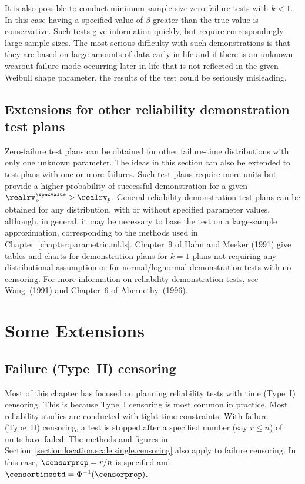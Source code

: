It is also possible to conduct minimum sample size zero-failure
tests with $k < 1$. In this case having a specified value of $\beta$
greater than the true value is conservative.  Such tests give
information quickly, but require correspondingly large sample
sizes. The most serious difficulty with such demonstrations is that
they are based on large amounts of data early in life and if there
is an unknown wearout failure mode occurring later in life that is
not reflected in the given Weibull shape parameter, the results of
the test could be seriously misleading.

\subsection{Extensions for other reliability demonstration test plans}

Zero-failure test plans can be obtained for other failure-time
distributions with only one unknown parameter. The ideas in this
section can also be extended to test plans with one or more failures.  Such
test plans require more units but provide a higher probability of
successful demonstration for a given $\realrv_{p}^{\specvalue} >
\realrv_{p}$.  General reliability demonstration test plans can be
obtained for any distribution, with or without specified parameter
values, although, in general, it may be necessary to base the test
on a large-sample approximation, corresponding to the methods used
in Chapter~\ref{chapter:parametric.ml.ls}.  Chapter~9 of Hahn and
Meeker (1991) give tables and charts for demonstration plans for
$k=1$ plans not requiring any distributional assumption or for
normal/lognormal demonstration tests with no censoring.  For more
information on reliability demonstration tests, see Wang~(1991) and
Chapter~6 of Abernethy~(1996).

\section{Some Extensions}
\label{section:test.plan.ext}

\subsection{Failure (Type~II) censoring}
\label{section:fail.typeII.cen}
Most of this chapter has focused on planning reliability tests with
time (Type~I) censoring. This is because Type~I censoring is most
common in practice.  Most reliability studies are conducted with tight
time constraints.  With failure (Type~II) censoring, a test is stopped
after a specified number (say $r \leq n$) of units have failed.  The
methods and figures in
Section~\ref{section:location.scale.single.censoring} also apply to
failure censoring.  In this case, $\censorprop=r/n$ is specified 
and $\censortimestd = \Phi^{-1}(\censorprop)$.

